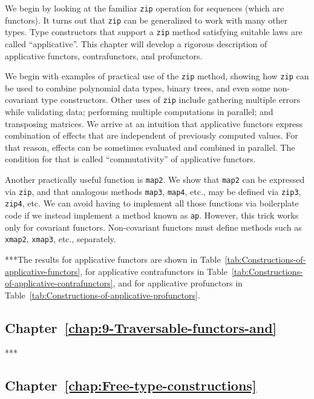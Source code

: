 We begin by looking at the familiar \lstinline!zip! operation for
sequences (which are functors). It turns out that \lstinline!zip!
can be generalized to work with many other types. Type constructors
that support a \lstinline!zip! method satisfying suitable laws are
called \textsf{``}applicative\textsf{''}. This chapter will develop a rigorous description
of applicative functors, contrafunctors, and profunctors. 

We begin with examples of practical use of the \lstinline!zip! method,
showing how \lstinline!zip! can be used to combine polynomial data
types, binary trees, and even some non-covariant type constructors.
Other uses of \lstinline!zip! include gathering multiple errors while
validating data; performing multiple computations in parallel; and
transposing matrices. We arrive at an intuition that applicative functors
express combination of effects that are independent of previously
computed values. For that reason, effects can be sometimes evaluated
and combined in parallel. The condition for that is called \textsf{``}commutativity\textsf{''}
of applicative functors.

Another practically useful function is \lstinline!map2!. We show
that \lstinline!map2! can be expressed via \lstinline!zip!, and
that analogous methods \lstinline!map3!, \lstinline!map4!, etc.,
may be defined via \lstinline!zip3!, \lstinline!zip4!, etc. We can
avoid having to implement all those functions via boilerplate code
if we instead implement a method known as \lstinline!ap!. However,
this trick works only for covariant functors. Non-covariant functors
must define methods such as \lstinline!xmap2!, \lstinline!xmap3!,
etc., separately.

{*}{*}{*}The results for applicative functors are shown in Table~\ref{tab:Constructions-of-applicative-functors},
for applicative contrafunctors in Table~\ref{tab:Constructions-of-applicative-contrafunctors},
and for applicative profunctors in Table~\ref{tab:Constructions-of-applicative-profunctors}.

\subsection{Chapter~\ref{chap:9-Traversable-functors-and}}

{*}{*}{*}

\subsection{Chapter~\ref{chap:Free-type-constructions}}

